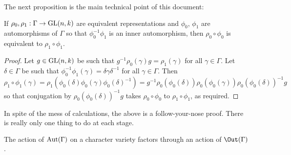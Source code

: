 \documentclass[11pt, oneside, usenames, dvipsnames, svgnames, table, draft]{amsart}
\begin{document}
The next proposition is the main technical point of this document:
\begin{proposition}
  If $\rho_0, \rho_1 : \Gamma \to \operatorname{GL}(n,k)$ are equivalent representations and $\phi_0$, $\phi_1$ are automorphisms of
  $\Gamma$ so that $\phi_0^{-1} \phi_1$ is an inner automorphism, then $\rho_0 \circ \phi_0$ is equivalent to $\rho_1
  \circ \phi_1$.
\end{proposition}
\begin{proof}
  Let $g \in \operatorname{GL}(n,k)$ be such that $g^{-1} \rho_0(\gamma) g = \rho_1(\gamma)$ for all $\gamma \in \Gamma$. Let $\delta \in \Gamma$ be such that
  $\phi_0^{-1} \phi_1(\gamma) = \delta \gamma \delta^{-1}$ for all $\gamma \in \Gamma$. Then
  \[ \rho_1 \circ \phi_1(\gamma) = \rho_1(\phi_0(\delta) \phi_0(\gamma) \phi_0(\delta)^{-1}) = g^{-1}
    \rho_0(\phi_0(\delta)) \rho_0(\phi_0(\gamma)) \rho_0(\phi_0(\delta))^{-1} g \]
  so that conjugation by $\rho_0(\phi_0(\delta))^{-1} g$ takes $\rho_0 \circ \phi_0$ to $\rho_1 \circ \phi_1$, as required.
\end{proof}
\begin{remark}
  In spite of the mess of calculations, the above is a follow-your-nose proof. There is really only one thing to do at
  each stage.
\end{remark}

\begin{corollary}
  The action of $\operatorname{Aut}(\Gamma)$ on a character variety factors through an action of $\Out(\Gamma)$.
\end{corollary}
\end{document}

